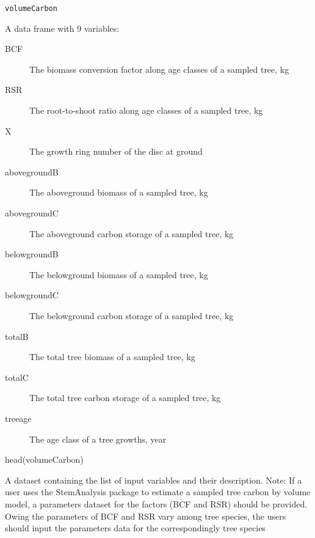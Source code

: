 \documentclass[a4paper]{book}
\begin{document}
%
\begin{Usage}
\begin{verbatim}
volumeCarbon
\end{verbatim}
\end{Usage}
%
\begin{Format}
A data frame with 9 variables:
\begin{description}

\item[BCF] The biomass conversion factor along age classes of a sampled tree, kg
\item[RSR] The root-to-shoot ratio along age classes of a sampled tree, kg
\item[X] The growth ring number of the disc at ground
\item[abovegroundB] The aboveground biomass of a sampled tree, kg
\item[abovegroundC] The aboveground carbon storage of a sampled tree, kg
\item[belowgroundB] The belowground biomass of a sampled tree, kg
\item[belowgroundC] The belowground carbon storage of a sampled tree, kg
\item[totalB] The total tree biomass of a sampled tree, kg
\item[totalC] The total tree carbon storage of a sampled tree, kg
\item[treeage] The age class of a tree growths, year

\end{description}

\end{Format}
%
\begin{Examples}
\begin{ExampleCode}
head(volumeCarbon)
\end{ExampleCode}
\end{Examples}
%
\begin{Description}\relax
A dataset containing the list of input variables and their description.
Note: If a user uses the StemAnalysis package to estimate a sampled tree
carbon by volume model, a parameters dataset for the factors (BCF and RSR)
should be provided. Owing the parameters of BCF and RSR vary among tree
species, the users should input the parameters data for the
correspondingly tree species
\end{Description}
\end{document}
